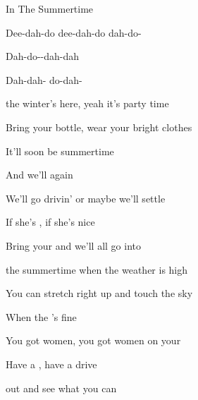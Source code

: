 \begin{SBSong}{In The Summertime}
\begin{SBVerse}
    Dee-dah-do dee-dah-do dah-do-
    
    Dah-do--dah-dah
    
    Dah-dah- do-dah-
  \end{SBVerse}
  \begin{SBVerse}
     the winter's here, yeah it's party time
    
    Bring your bottle, wear your bright clothes
    
    It'll soon be summertime
    
    And we'll  again
    
    We'll go drivin' or maybe we'll settle 
    
    If she's , if she's nice
    
    Bring your  and we'll all go into  
  \end{SBVerse}
  \begin{SBVerse}
     the summertime when the weather is high
    
    You can stretch right up and touch the sky
    
    When the 's fine
    
    You got women, you got women on your 
    
    Have a , have a drive
    
     out and see what you can 
  \end{SBVerse}
\end{SBSong}

